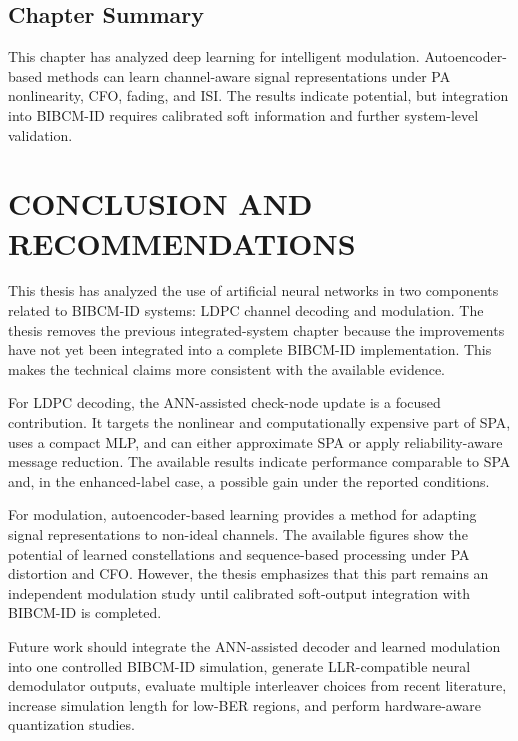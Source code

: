 \section{Chapter Summary}
This chapter has analyzed deep learning for intelligent modulation. Autoencoder-based methods can learn channel-aware signal representations under PA nonlinearity, CFO, fading, and ISI. The results indicate potential, but integration into BIBCM-ID requires calibrated soft information and further system-level validation.

\chapter*{CONCLUSION AND RECOMMENDATIONS}
This thesis has analyzed the use of artificial neural networks in two components related to BIBCM-ID systems: LDPC channel decoding and modulation. The thesis removes the previous integrated-system chapter because the improvements have not yet been integrated into a complete BIBCM-ID implementation. This makes the technical claims more consistent with the available evidence.

For LDPC decoding, the ANN-assisted check-node update is a focused contribution. It targets the nonlinear and computationally expensive part of SPA, uses a compact MLP, and can either approximate SPA or apply reliability-aware message reduction. The available results indicate performance comparable to SPA and, in the enhanced-label case, a possible gain under the reported conditions.

For modulation, autoencoder-based learning provides a method for adapting signal representations to non-ideal channels. The available figures show the potential of learned constellations and sequence-based processing under PA distortion and CFO. However, the thesis emphasizes that this part remains an independent modulation study until calibrated soft-output integration with BIBCM-ID is completed.

Future work should integrate the ANN-assisted decoder and learned modulation into one controlled BIBCM-ID simulation, generate LLR-compatible neural demodulator outputs, evaluate multiple interleaver choices from recent literature, increase simulation length for low-BER regions, and perform hardware-aware quantization studies.


